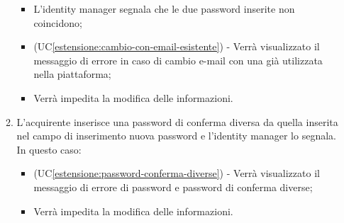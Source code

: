 \begin{itemize}
\begin{enumerate}[label=\lett]
        \begin{itemize}
            \item L'identity manager segnala che le due password inserite non coincidono;
            \item (UC\ref{estensione:cambio-con-email-esistente}) - Verrà visualizzato il messaggio di errore in caso di cambio e-mail con una già utilizzata nella piattaforma;
            \item Verrà impedita la modifica delle informazioni.
        \end{itemize}
        \item L'acquirente inserisce una password di conferma diversa da quella inserita nel campo di inserimento nuova password e l'identity manager lo segnala. In questo caso:
        \begin{itemize}
            \item (UC\ref{estensione:password-conferma-diverse}) - Verrà visualizzato il messaggio di errore di password e password di conferma diverse;
            \item Verrà impedita la modifica delle informazioni.
        \end{itemize}
    \end{enumerate}
\end{itemize}

\label{modifica-informazioni-acquirente.nome}

